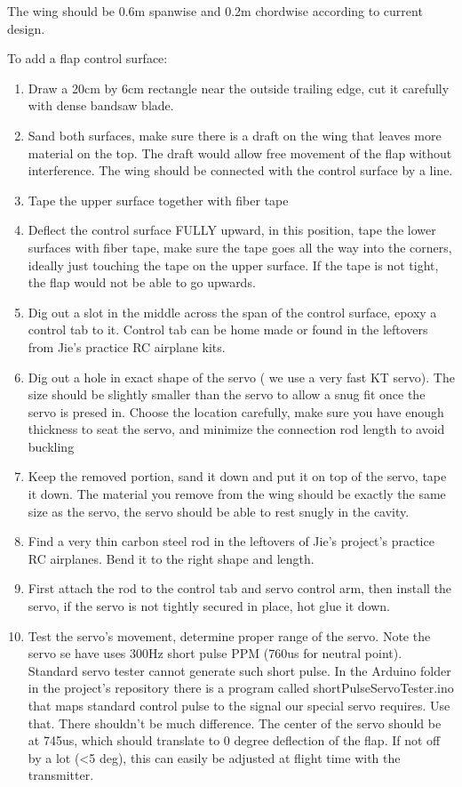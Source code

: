 \documentclass[12pt]{article}
\begin{document}
The wing should be 0.6m spanwise and 0.2m chordwise according to current design. 

To add a flap control surface:
\begin{enumerate}
  \item Draw a 20cm by 6cm rectangle near the outside trailing edge, cut it carefully with dense bandsaw blade.
  \item Sand both surfaces, make sure there is a draft on the wing that leaves more material on the top. The draft would allow free movement of the flap without interference. The wing should be connected with the control surface by a line. 
  \item Tape the upper surface together with fiber tape
  \item Deflect the control surface FULLY upward, in this position, tape the lower surfaces with fiber tape, make sure the tape goes all the way into the corners, ideally just touching the tape on the upper surface. If the tape is not tight, the flap would not be able to go upwards.
  \item Dig out a slot in the middle across the span of the control surface, epoxy a control tab to it. Control tab can be home made or found in the leftovers from Jie's practice RC airplane kits.
  \item Dig out a hole in exact shape of the servo ( we use a very fast KT servo). The size should be slightly smaller than the servo to allow a snug fit once the servo is presed in. Choose the location carefully, make sure you have enough thickness to seat the servo, and minimize the connection rod length to avoid buckling
  \item Keep the removed portion, sand it down and put it on top of the servo, tape it down. The material you remove from the wing should be exactly the same size as the servo, the servo should be able to rest snugly in the cavity.
  \item Find a very thin carbon steel rod in the leftovers of Jie's project's practice RC airplanes. Bend it to the right shape and length.
  \item First attach the rod to the control tab and servo control arm, then install the servo, if the servo is not tightly secured in place, hot glue it down.
  \item Test the servo's movement, determine proper range of the servo. Note the servo se have uses 300Hz short pulse PPM (760us for neutral point). Standard servo tester cannot generate such short pulse. In the Arduino folder in the project's repository there is a program called shortPulseServoTester.ino that maps standard control pulse to the signal our special servo requires. Use that. There shouldn't be much difference. The center of the servo should be at 745us, which should translate to 0 degree deflection of the flap. If not off by a lot (<5 deg), this can easily be adjusted at flight time with the transmitter.
\end{enumerate}
\end{document}
